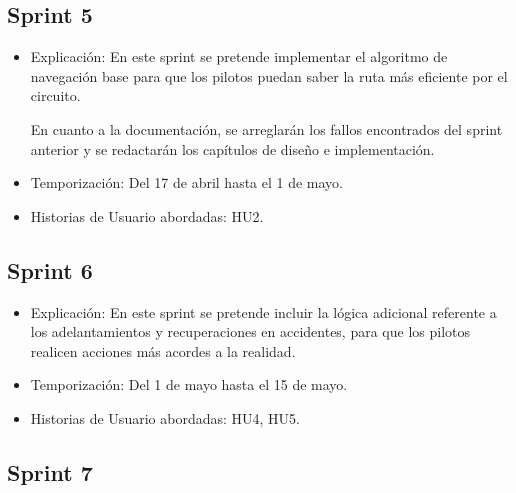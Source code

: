 \subsection{Sprint 5}
\begin{itemize}
    \item Explicación: En este sprint se pretende implementar el algoritmo de navegación base para que los pilotos puedan saber la ruta más eficiente por el circuito.


    En cuanto a la documentación, se arreglarán los fallos encontrados del sprint anterior y se redactarán los capítulos de diseño e implementación.

    \item Temporización: Del 17 de abril hasta el 1 de mayo.
    \item Historias de Usuario abordadas: HU2.
\end{itemize}

\newpage

\subsection{Sprint 6}

\begin{itemize}
    \item Explicación: En este sprint se pretende incluir la lógica adicional referente a los adelantamientos y recuperaciones en accidentes, para que los pilotos realicen acciones más acordes a la realidad.
    

    \item Temporización: Del 1 de mayo hasta el 15 de mayo.
    \item Historias de Usuario abordadas: HU4, HU5.
\end{itemize}

\subsection{Sprint 7}

